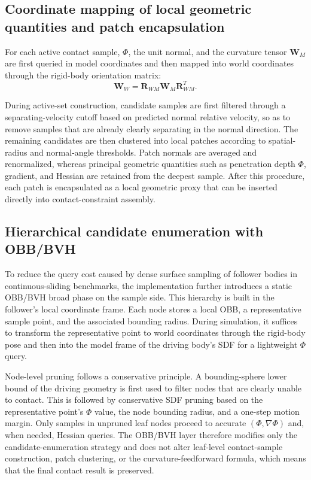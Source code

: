 \subsection{Coordinate mapping of local geometric quantities and patch encapsulation}
For each active contact sample, $\Phi$, the unit normal, and the curvature tensor $\mathbf{W}_M$ are first queried in model coordinates and then mapped into world coordinates through the rigid-body orientation matrix:
\begin{equation}
    \mathbf{W}_W = \mathbf{R}_{WM}\mathbf{W}_M\mathbf{R}_{WM}^T.
\end{equation}

During active-set construction, candidate samples are first filtered through a separating-velocity cutoff based on predicted normal relative velocity, so as to remove samples that are already clearly separating in the normal direction. The remaining candidates are then clustered into local patches according to spatial-radius and normal-angle thresholds. Patch normals are averaged and renormalized, whereas principal geometric quantities such as penetration depth $\Phi$, gradient, and Hessian are retained from the deepest sample. After this procedure, each patch is encapsulated as a local geometric proxy that can be inserted directly into contact-constraint assembly.

\subsection{Hierarchical candidate enumeration with OBB/BVH}
To reduce the query cost caused by dense surface sampling of follower bodies in continuous-sliding benchmarks, the implementation further introduces a static OBB/BVH broad phase on the sample side. This hierarchy is built in the follower's local coordinate frame. Each node stores a local OBB, a representative sample point, and the associated bounding radius. During simulation, it suffices to transform the representative point to world coordinates through the rigid-body pose and then into the model frame of the driving body's SDF for a lightweight $\Phi$ query.

Node-level pruning follows a conservative principle. A bounding-sphere lower bound of the driving geometry is first used to filter nodes that are clearly unable to contact. This is followed by conservative SDF pruning based on the representative point's $\Phi$ value, the node bounding radius, and a one-step motion margin. Only samples in unpruned leaf nodes proceed to accurate $(\Phi,\nabla\Phi)$ and, when needed, Hessian queries. The OBB/BVH layer therefore modifies only the candidate-enumeration strategy and does not alter leaf-level contact-sample construction, patch clustering, or the curvature-feedforward formula, which means that the final contact result is preserved.

